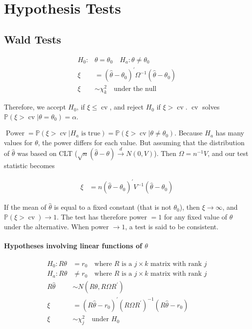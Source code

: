 \section{Hypothesis Tests}

\subsection{Wald Tests}

\begin{align*}
    H_0: & \theta = \theta_0 \quad H_a: \theta \neq \theta_0 \\
    \xi&=\left(\hat{\theta}-\theta_0\right)^{\prime} \Omega^{-1}\left(\hat{\theta}-\theta_0\right) \\
    \xi &\sim \chi_k^2 \quad \text{under the null}
\end{align*}

Therefore, we accept $H_0$, if $\xi\leq \operatorname{cv}$, and reject $H_0$ if $\xi > \operatorname{cv}$. $\operatorname{cv}$ solves $\mathbb{P}(\xi>\operatorname{cv}| \theta = \theta_0)=\alpha$.

$\operatorname{Power} = \mathbb{P}(\xi>\operatorname{cv}| H_a \text{ is true}) = \mathbb{P}(\xi>\operatorname{cv}| \theta \neq \theta_0)$. Because $H_a$ has many values for $\theta$, the power differs for each value. But assuming that the distribution of $\hat{\theta}$ was based on CLT ($\sqrt{n}(\hat{\theta}-\theta) \stackrel{d}{\longrightarrow} N (0, V)$). Then $\Omega=n^{-1} V$, and our test statistic becomes

\begin{align*}
    \xi&=n\left(\hat{\theta}-\theta_0\right)^{\prime} V^{-1}\left(\hat{\theta}-\theta_0\right)
\end{align*}

If the mean of $\hat{\theta}$ is equal to a fixed constant (that is not $\theta_0$), then $\xi \rightarrow\infty$, and $\mathbb{P}(\xi>\operatorname{cv})\rightarrow 1$. The test has therefore power $=1$ for any fixed value of $\theta$ under the alternative. When power $\rightarrow 1$, a test is said to be consistent.

\paragraph{Hypotheses involving linear functions of $\theta$}

\begin{align*}
    H_0: R\theta &= r_0 \quad \text{where $R$ is a $j\times k$ matrix with rank $j$}\\
    H_a: R\theta &\neq r_0 \quad \text{where $R$ is a $j\times k$ matrix with rank $j$}\\
    R \hat{\theta} &\sim N\left(R \theta, R \Omega R^{\prime}\right) \\
    \xi&=\left(R \hat{\theta}-r_0\right)^{\prime}\left(R \Omega R^{\prime}\right)^{-1}\left(R \hat{\theta}-r_0\right) \\
    \xi&\sim\chi_j^2 \quad \text{under } H_0
\end{align*}

